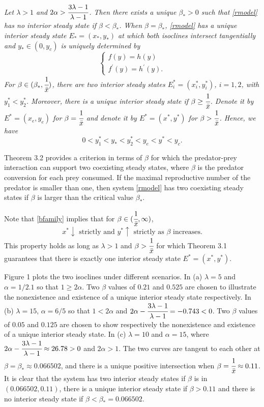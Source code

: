 \documentclass[11pt]{article}
\begin{document}
\medskip

  {\em Let $\lambda>1$ and
$2\alpha>\cfrac{3\lambda-1}{\lambda-1}$. Then there exists a
unique $\beta_*>0$ such that \eqref{rmodel} has no interior steady
state if $\beta<\beta_*$.  When $\beta=\beta_*$, \eqref{rmodel}
has a unique interior steady state $E_*=(x_*, y_*)$ at which both
isoclines intersect tangentially and $y_*\in (0, y_c)$ is uniquely
determined by
\begin{equation}\label{T}\left\{\begin{array}{ll}
f(y)= h(y)\\[1ex]
f^\prime(y)=h^\prime(y).
\end{array}\right.
\end{equation}
For $\beta\in(\beta_*, \cfrac{1}{\bar x})$, there are two interior
steady states $E_i^*=(x_i^*,y_i^*)$, $i=1,2$, with $y_1^*<y_2^*$.
Moreover, there is a unique interior steady state
 if $\beta \geq \cfrac{1}{\bar x}$. Denote it by $E^*=(x_e,y_e)$ for $\beta =\cfrac{1}{\bar x}$ and denote it by $E^*=(x^*,y^*)$ for   $\beta > \cfrac{1}{\bar x}$.
 Hence, we have
 \begin{equation}\label{order}
 0< y_1^*< y_* <y_2^*< y_e < y^*< y_c.
 \end{equation}   }


Theorem 3.2 provides a criterion in terms of $\beta$ for which the
predator-prey interaction can support two coexisting steady
states, where $\beta$ is the predator conversion for each prey
consumed. If the maximal reproductive number of the predator is
smaller than one, then system \eqref{rmodel} has two coexisting
steady states if $\beta$ is larger than the critical value
$\beta_*$.


 Note that \eqref{bfamily} implies that for $\beta \in
( \cfrac{1}{\bar x}, \infty)$,
$$
x^* \downarrow \mbox{ strictly and } y^* \uparrow \mbox{ strictly as } \beta \mbox{ increases.}
$$
This property holds as long as $\lambda >1$ and  $\beta >
\cfrac{1}{\bar x}$ for which Theorem 3.1 guarantees that there is
exactly one interior steady state $E^*=(x^*,y^*)$.

\bigskip

Figure 1 plots the two isoclines under different scenarios. In (a)
$\lambda=5$ and $\alpha=1/2.1$ so that $1\geq 2\alpha$. Two
$\beta$ values of $0.21$ and $0.525$ are chosen to illustrate the
nonexistence and existence of a unique interior steady state
respectively. In (b) $\lambda=15$, $\alpha=6/5$ so that
$1<2\alpha$ and $2\alpha-\cfrac{3\lambda-1}{\lambda-1}=-0.743<0$.
Two $\beta$ values of $0.05$ and $0.125$ are chosen to show
respectively the nonexistence and existence of a unique interior
steady state. In (c) $\lambda=10$ and $\alpha=15$, where
$2\alpha-\cfrac{3\lambda-1}{\lambda-1}\approx 26.78>0$ and
$2\alpha>1$. The two curves are tangent to each other at
$\beta=\beta_*\approx 0.066502$, and there is a unique positive
intersection when $\beta=\cfrac{1}{\bar x}\approx 0.11$. It is
clear that the system has two interior steady states if $\beta$ is
in $(0.066502, 0.11)$, there is a unique interior steady state if
$\beta>0.11$  and there is no interior steady state if
$\beta<\beta_*=0.066502$.
\end{document}
